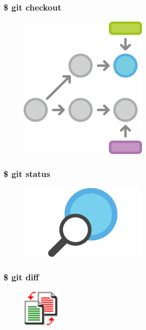 \documentclass{beamer}
\begin{document}
\begin{frame}
    \frametitle{\$ git checkout}
    \begin{figure}[h!]
        \begin{center}
            \includegraphics[scale=0.7]{checkout.png}
        \end{center}
    \end{figure}
\end{frame}

\begin{frame}
    \frametitle{\$ git status}
    \begin{figure}[h!]
        \begin{center}
            \includegraphics[scale=0.8]{status.png}
        \end{center}
    \end{figure}
\end{frame}

\begin{frame}
    \frametitle{\$ git diff}
    \begin{figure}[h!]
        \begin{center}
            \includegraphics[scale=1.2]{diff.png}
        \end{center}
    \end{figure}
\end{frame}
\end{document}
